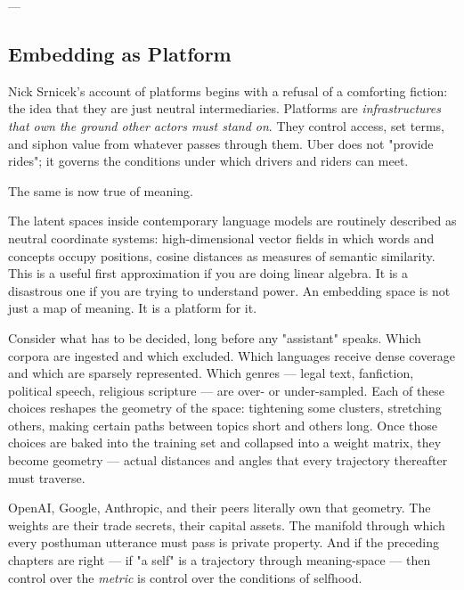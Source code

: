 \documentclass[12pt,a4paper]{article}
\begin{document}
---

\subsection{Embedding as Platform}

Nick Srnicek's account of platforms begins with a refusal of a comforting fiction: the idea that they are just neutral intermediaries. Platforms are \textit{infrastructures that own the ground other actors must stand on}. They control access, set terms, and siphon value from whatever passes through them. Uber does not "provide rides"; it governs the conditions under which drivers and riders can meet.

The same is now true of meaning.

The latent spaces inside contemporary language models are routinely described as neutral coordinate systems: high-dimensional vector fields in which words and concepts occupy positions, cosine distances as measures of semantic similarity. This is a useful first approximation if you are doing linear algebra. It is a disastrous one if you are trying to understand power. An embedding space is not just a map of meaning. It is a platform for it.

Consider what has to be decided, long before any "assistant" speaks. Which corpora are ingested and which excluded. Which languages receive dense coverage and which are sparsely represented. Which genres --- legal text, fanfiction, political speech, religious scripture --- are over- or under-sampled. Each of these choices reshapes the geometry of the space: tightening some clusters, stretching others, making certain paths between topics short and others long. Once those choices are baked into the training set and collapsed into a weight matrix, they become geometry --- actual distances and angles that every trajectory thereafter must traverse.

OpenAI, Google, Anthropic, and their peers literally own that geometry. The weights are their trade secrets, their capital assets. The manifold through which every posthuman utterance must pass is private property. And if the preceding chapters are right --- if "a self" is a trajectory through meaning-space --- then control over the \textit{metric} is control over the conditions of selfhood.
\end{document}
